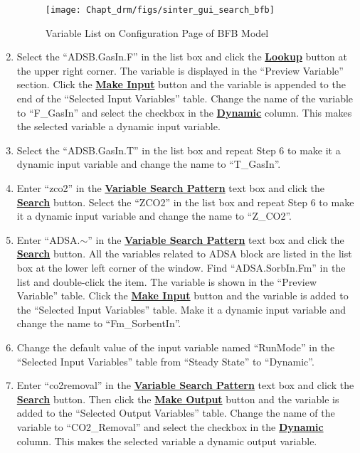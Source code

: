\begin{enumerate}
	\begin{figure}[H]
		\begin{center}
			\texttt{[image: Chapt\_drm/figs/sinter\_gui\_search\_bfb]}
			\caption{Variable List on Configuration Page of BFB Model}
			\label{fig.sinter_gui_search_bfb}
		\end{center}
	\end{figure}
	\item Select the ``ADSB.GasIn.F'' in the list box and click the \textbf{\underline{Lookup}} button at the upper right corner.  The variable is displayed in the ``Preview Variable'' section.  Click the \textbf{\underline{Make Input}} button and the variable is appended to the end of the ``Selected Input Variables'' table.  Change the name of the variable to ``F\_GasIn'' and select the checkbox in the \textbf{\underline{Dynamic}} column.  This makes the selected variable a dynamic input variable.
	\item Select the ``ADSB.GasIn.T'' in the list box and repeat Step 6 to make it a dynamic input variable and change the name to ``T\_GasIn''.
	\item Enter ``zco2'' in the \textbf{\underline{Variable Search Pattern}} text box and click the \textbf{\underline{Search}} button.  Select the ``ZCO2'' in the list box and repeat Step 6 to make it a dynamic input variable and change the name to ``Z\_CO2''.
	\item Enter ``ADSA.$\sim$'' in the \textbf{\underline{Variable Search Pattern}} text box and click the \textbf{\underline{Search}} button.  All the variables related to ADSA block are listed in the list box at the lower left corner of the window. Find ``ADSA.SorbIn.Fm'' in the list and double-click the item.  The variable is shown in the ``Preview Variable'' table.  Click the \textbf{\underline{Make Input}} button and the variable is added to the ``Selected Input Variables'' table.  Make it a dynamic input variable and change the name to ``Fm\_SorbentIn''.
	\item Change the default value of the input variable named ``RunMode'' in the ``Selected Input Variables'' table from ``Steady State'' to ``Dynamic''.
	\item Enter ``co2removal'' in the \textbf{\underline{Variable Search Pattern}} text box and click the \textbf{\underline{Search}} button.  Then click the \textbf{\underline{Make Output}} button and the variable is added to the ``Selected Output Variables'' table.  Change the name of the variable to ``CO2\_Removal'' and select the checkbox in the \textbf{\underline{Dynamic}} column.  This makes the selected variable a dynamic output variable.

\end{enumerate}
